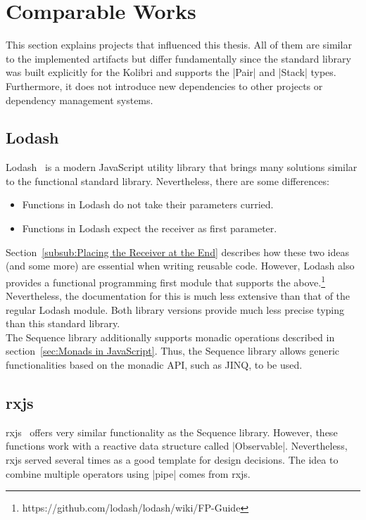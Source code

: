 \section{Comparable Works} %
\label{sec:Comparable Works}
This section explains projects that influenced this thesis. All of them are
similar to the implemented artifacts but differ fundamentally since the
standard library was built explicitly for the Kolibri and supports the |Pair|
and |Stack| types. Furthermore, it does not introduce new dependencies to other
projects or dependency management systems.

\subsection{Lodash} %
\label{sub:Lodash}
Lodash~\cite{lodash_2023} is a modern JavaScript utility library that brings many solutions
similar to the functional standard library. Nevertheless, there are some differences:
\begin{itemize}
  \item Functions in Lodash do not take their parameters curried.
  \item Functions in Lodash expect the receiver as first parameter.
\end{itemize}
Section~\ref{subsub:Placing the Receiver at the End} describes how these two
ideas (and some more) are essential when writing reusable code. However, Lodash
also provides a functional programming first module that supports the
above.\footnote{https://github.com/lodash/lodash/wiki/FP-Guide}
Nevertheless, the documentation for this is much less extensive than that of
the regular Lodash module. Both library versions provide much less precise
typing than this standard library.\\
The Sequence library additionally supports monadic operations described in
section~\ref{sec:Monads in JavaScript}. Thus, the Sequence
library allows generic functionalities based on the monadic API, such as JINQ,
to be used.

\subsection{rxjs} %
\label{sub:rxjs}
rxjs~\cite{rxjs_2023} offers very similar functionality as the Sequence library.
However, these functions work with a reactive data structure called
|Observable|. Nevertheless, rxjs served several times as a good template for
design decisions. The idea to combine multiple operators using |pipe| comes
from rxjs.

